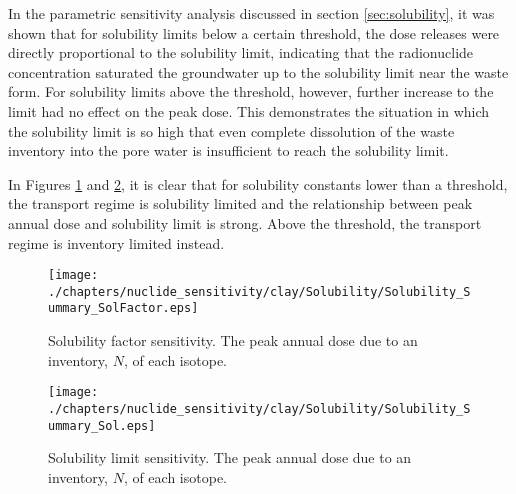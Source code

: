 In the parametric sensitivity analysis discussed in section 
\ref{sec:solubility}, it was shown that for solubility limits below a certain 
threshold, the dose releases were directly proportional to the solubility 
limit, indicating that the radionuclide concentration saturated the groundwater 
up to the solubility limit near the waste form.  For solubility limits above 
the threshold, however, further increase to the limit had no effect on the peak 
dose. This demonstrates the situation in which the solubility limit is so high 
that even complete dissolution of the waste inventory into the pore water is 
insufficient to reach the solubility limit.

In Figures \ref{fig:SolSumFactor} and \ref{fig:SolSum}, it is clear that for 
solubility constants lower than a threshold, the transport regime is solubility 
limited and the relationship between peak annual dose and solubility limit is 
strong.  Above the threshold, the transport regime is inventory limited 
instead.  

\begin{figure}[ht]
\centering
\texttt{[image: ./chapters/nuclide\_sensitivity/clay/Solubility/Solubility\_Summary\_SolFactor.eps]}
\caption{Solubility factor sensitivity. The peak annual dose due to an inventory, 
$N$, of each isotope.}
\label{fig:SolSumFactor}
\end{figure}

\begin{figure}[ht]
\centering
\texttt{[image: ./chapters/nuclide\_sensitivity/clay/Solubility/Solubility\_Summary\_Sol.eps]}
\caption{Solubility limit sensitivity. The peak annual dose due to an inventory, 
$N$, of each isotope.}
\label{fig:SolSum}
\end{figure}
\FloatBarrier
